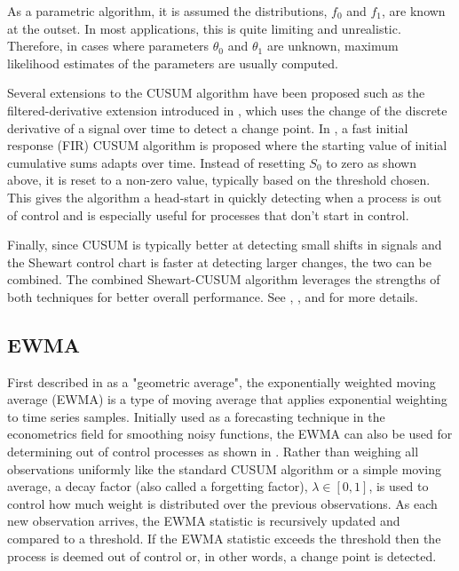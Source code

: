 As a parametric algorithm, it is assumed the distributions, $f_0$ and $f_1$, are known at the outset. In most applications, this is quite limiting and unrealistic. Therefore, in cases where parameters $\theta_0$ and $\theta_1$ are unknown, maximum likelihood estimates of the parameters are usually computed.

Several extensions to the CUSUM algorithm have been proposed such as the filtered-derivative extension introduced in \cite{basseville1981edge}, which uses the change of the discrete derivative of a signal over time to detect a change point. In \cite{lucas1982fast}, a fast initial response (FIR) CUSUM algorithm is proposed where the starting value of initial cumulative sums adapts over time. Instead of resetting $S_0$ to zero as shown above, it is reset to a non-zero value, typically based on the threshold chosen. This gives the algorithm a head-start in quickly detecting when a process is out of control and is especially useful for processes that don't start in control.

Finally, since CUSUM is typically better at detecting small shifts in signals and the Shewart control chart is faster at detecting larger changes, the two can be combined. The combined Shewart-CUSUM algorithm leverages the strengths of both techniques for better overall performance. See \cite{lucas1982combined}, \cite{yashchin1985analysis}, and \cite{westgard1977combined} for more details. 

\subsection{EWMA}
First described in \cite{roberts1959control} as a "geometric average", the exponentially weighted moving average (EWMA) is a type of moving average that applies exponential weighting to time series samples. Initially used as a forecasting technique in the econometrics field for smoothing noisy functions, the EWMA can also be used for determining out of control processes as shown in \cite{hunter1986exponentially}. Rather than weighing all observations uniformly like the standard CUSUM algorithm or a simple moving average, a decay factor (also called a  forgetting factor), $\lambda \in [0,1]$, is used to control how much weight is distributed over the previous observations. As each new observation arrives, the EWMA statistic is recursively updated and compared to a threshold. If the EWMA statistic exceeds the threshold then the process is deemed out of control or, in other words, a change point is detected.

